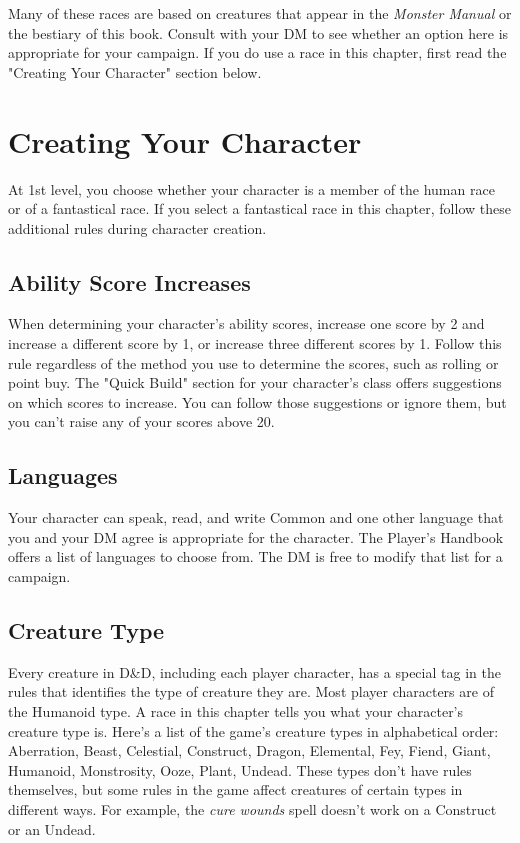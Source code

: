 \documentclass[10pt,a4paper,twoside,bg=print,twocolumn,openany,nodeprecatedcode]{dndbook}
\begin{document}
Many of these races are based on creatures that appear in the \textit{Monster Manual} or the bestiary of this book. Consult with your DM to see whether an option here is appropriate for your campaign. If you do use a race in this chapter, first read the "Creating Your Character" section below.

\section{Creating Your Character}
At 1st level, you choose whether your character is a member of the human race or of a fantastical race. If you select a fantastical race in this chapter, follow these additional rules during character creation.

\subsection{Ability Score Increases}
When determining your character's ability scores, increase one score by 2 and increase a different score by 1, or increase three different scores by 1. Follow this rule regardless of the method you use to determine the scores, such as rolling or point buy. The "Quick Build" section for your character's class offers suggestions on which scores to increase. You can follow those suggestions or ignore them, but you can't raise any of your scores above 20.

\subsection{Languages}
Your character can speak, read, and write Common and one other language that you and your DM agree is appropriate for the character. The Player's Handbook offers a list of languages to choose from. The DM is free to modify that list for a campaign.

\subsection{Creature Type}
Every creature in D\&D, including each player character, has a special tag in the rules that identifies the type of creature they are. Most player characters are of the Humanoid type. A race in this chapter tells you what your character's creature type is. Here's a list of the game's creature types in alphabetical order: Aberration, Beast, Celestial, Construct, Dragon, Elemental, Fey, Fiend, Giant, Humanoid, Monstrosity, Ooze, Plant, Undead. These types don't have rules themselves, but some rules in the game affect creatures of certain types in different ways. For example, the \textit{cure wounds} spell doesn't work on a Construct or an Undead.
\end{document}
